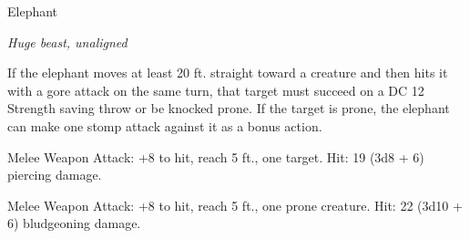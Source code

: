 \begin{monsterbox}{Elephant}
\begin{hangingpar}
\textit{Huge beast, unaligned}
\end{hangingpar}
\dndline%
\basics[%
armorclass = 12,
hitpoints = 8d12 + 24,
speed = {40 ft.}
]
\dndline%
\stats[%
STR = \stat{22},
DEX = \stat{9},
CON = \stat{17},
INT = \stat{3},
WIS = \stat{11},
CHA = \stat{6}
]
\dndline%
\details[%
skills={},
damageimmunities={},
savingthrows={},
conditionimmunities={},
damageresistances={},
damagevulnerabilities={},
senses={passive Perception 10},
challenge=4
]
\dndline%
\begin{monsteraction}
If the elephant moves at least 20 ft. straight toward a creature and then hits it with a gore attack on the same turn, that target must succeed on a DC 12 Strength saving throw or be knocked prone. If the target is prone, the elephant can make one stomp attack against it as a bonus action.
\end{monsteraction}
\begin{monsteraction}[Gore]
Melee Weapon Attack: +8 to hit, reach 5 ft., one target. Hit: 19 (3d8 + 6) piercing damage.
\end{monsteraction}
\begin{monsteraction}[Stomp]
Melee Weapon Attack: +8 to hit, reach 5 ft., one prone creature. Hit: 22 (3d10 + 6) bludgeoning damage.
\end{monsteraction}
\end{monsterbox}